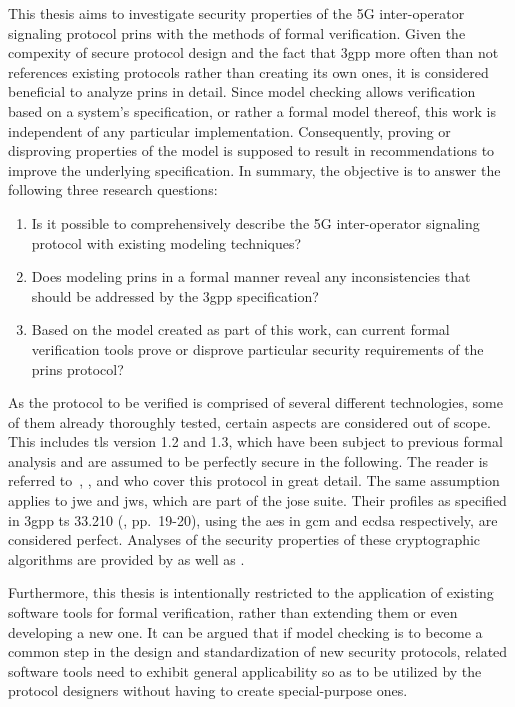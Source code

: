 This thesis aims to investigate security properties of the 5G inter-operator signaling protocol \gls{prins} with the methods of formal verification.
Given the compexity of secure protocol design and the fact that \gls{3gpp} more often than not references existing protocols rather than creating its own ones, it is considered beneficial to analyze \gls{prins} in detail.
Since model checking allows verification based on a system's specification, or rather a formal model thereof, this work is independent of any particular implementation.
Consequently, proving or disproving properties of the model is supposed to result in recommendations to improve the underlying specification.
In summary, the objective is to answer the following three research questions:

\begin{enumerate}[label=(\arabic*)]
    \item Is it possible to comprehensively describe the 5G inter-operator signaling protocol with existing modeling techniques?

    \item Does modeling \gls{prins} in a formal manner reveal any inconsistencies that should be addressed by the \gls{3gpp} specification?

    \item Based on the model created as part of this work, can current formal verification tools prove or disprove particular security requirements of the \gls{prins} protocol?
\end{enumerate}

As the protocol to be verified is comprised of several different technologies, some of them already thoroughly tested, certain aspects are considered out of scope.
This includes \gls{tls} version 1.2 and 1.3, which have been subject to previous formal analysis and are assumed to be perfectly secure in the following.
The reader is referred to~\cite{horvat2015formal}, \cite{cremers2017comprehensive}, and \cite{van2018analysis} who cover this protocol in great detail.
The same assumption applies to \gls{jwe} and \gls{jws}, which are part of the \gls{jose} suite.
Their profiles as specified in \gls{3gpp} \gls{ts} 33.210 (\cite{3gpp.33.210}, pp.~19-20), using the \gls{aes} in \gls{gcm} and \gls{ecdsa} respectively, are considered perfect.
Analyses of the security properties of these cryptographic algorithms are provided by \cite{mcgrew2004security} as well as \cite{fersch2016provable}.

Furthermore, this thesis is intentionally restricted to the application of existing software tools for formal verification, rather than extending them or even developing a new one.
It can be argued that if model checking is to become a common step in the design and standardization of new security protocols, related software tools need to exhibit general applicability so as to be utilized by the protocol designers without having to create special-purpose ones.